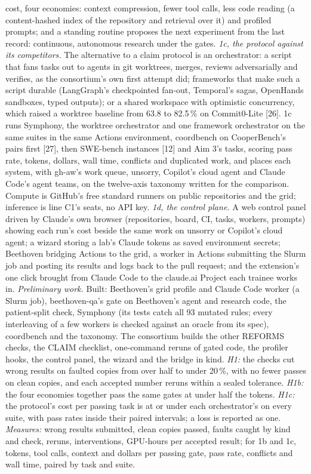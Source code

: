 \documentclass[10pt,letterpaper]{article}
\newcommand{\pct}{\,\%}
\begin{document}
cost, four economies: context compression, fewer tool calls, less code reading (a content-hashed index of the
repository and retrieval over it) and profiled prompts; and a standing routine proposes the next experiment from the last record: continuous, autonomous research under the gates. \emph{1c, the protocol
against its competitors.} The alternative to a claim protocol is an orchestrator: a script that fans tasks out to
agents in git worktrees, merges, reviews adversarially and verifies, as the consortium's own first attempt did; frameworks that make such a script durable (LangGraph's checkpointed fan-out, Temporal's sagas, OpenHands sandboxes, typed outputs); or a shared workspace with optimistic concurrency, which raised a worktree baseline from 63.8 to 82.5\pct{}
on Commit0-Lite [26]. 1c runs Symphony, the worktree orchestrator and one framework orchestrator on the same suites in
the same Actions environment, coordbench on CooperBench's pairs first [27], then SWE-bench instances [12] and Aim 3's
tasks, scoring pass rate, tokens, dollars, wall time, conflicts and duplicated work, and places each system, with
gh-aw's work queue, unsorry, Copilot's cloud agent and Claude Code's agent teams, on the twelve-axis taxonomy written for the comparison. Compute is GitHub's free standard runners
on public repositories and the grid; inference is line C1's seats, no API key. \emph{1d, the
control plane.} A web control panel driven by Claude's own browser (repositories, board, CI, tasks, workers, prompts)
showing each run's cost beside the same work on unsorry or Copilot's cloud agent; a wizard storing a lab's Claude
tokens as saved environment secrets; Beethoven bridging Actions to the grid, a worker in Actions submitting the Slurm
job and posting its results and logs back to the pull request; and the extension's one click brought from Claude Code
to the claude.ai Project each trainee works in. \emph{Preliminary work.} Built: Beethoven's grid profile and Claude Code worker (a Slurm job),
beethoven-qa's gate on Beethoven's agent and research code, the patient-split check, Symphony (its tests catch all 93
mutated rules; every interleaving of a few workers is checked against an oracle from its spec), coordbench and the taxonomy. The consortium builds the other
REFORMS checks, the CLAIM checklist, one-command reruns of gated code, the profiler hooks, the control panel, the
wizard and the bridge in kind. \emph{H1:} the checks
cut wrong results on faulted copies from over half to under 20\pct{}, with no fewer passes on clean copies, and each
accepted number reruns within a sealed tolerance. \emph{H1b:} the four economies together pass the same gates at under
half the tokens. \emph{H1c:} the protocol's cost per passing task is at or under each orchestrator's on every suite,
with pass rates inside their paired intervals; a loss is reported as one. \emph{Measures:} wrong results submitted,
clean copies passed, faults caught by kind and check, reruns, interventions, GPU-hours per accepted result; for 1b and
1c, tokens, tool calls, context and dollars per passing gate, pass rate, conflicts and wall time, paired by task and
suite.
\end{document}
